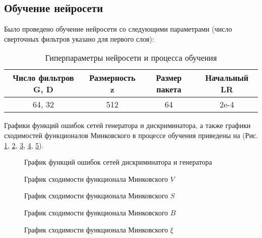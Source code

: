 	\subsection{Обучение нейросети}
		Было проведено обучение нейросети со следующими параметрами (число сверточных фильтров указано для первого слоя):
		\begin{table}[h!]
			\begin{center}
				\begin{tabular}{|c|c|c|c|}
					\hline
					Число фильтров G, D & Размерность z & Размер пакета & Начальный LR \\
					\hline
					64, 32 & 512 & 64 & 2e-4 \\
					\hline
				\end{tabular}
				\caption{Гиперпараметры нейросети и процесса обучения}
			\end{center}
		\end{table}
		
		Графики функций ошибок сетей генератора и дискриминатора, а также графики сходимостей функционалов Минковского в процессе обучения приведены на (Рис. \ref{loss-plot}, \ref{V-plot}, \ref{S-plot}, \ref{B-plot}, \ref{Xi-plot}).
		
		\begin{figure}[h!]
			\caption{График функций ошибок сетей дискриминатора и генератора}
			\label{loss-plot}
		\end{figure}
	
		\begin{figure}[h!]
			\caption{График сходимости функционала Минковского $V$}
			\label{V-plot}
		\end{figure}
		
		\begin{figure}[h!]
			\caption{График сходимости функционала Минковского $S$}
			\label{S-plot}
		\end{figure}
	
		\begin{figure}[h!]
			\caption{График сходимости функционала Минковского $B$}
			\label{B-plot}
		\end{figure}
	
		\begin{figure}[h!]
			\caption{График сходимости функционала Минковского $\xi$}
			\label{Xi-plot}
		\end{figure}	
		
